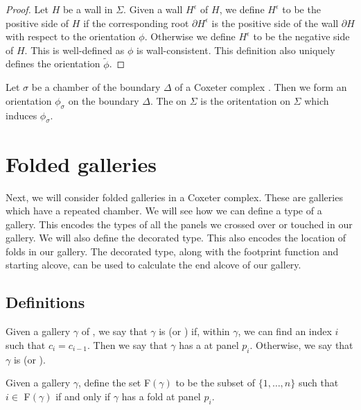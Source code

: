 \documentclass[11pt]{article}
\begin{document}
\begin{proof}
    Let $H$ be a wall in $\Sigma$. Given a wall $H^\epsilon$ of $H$, we define $H^\epsilon$ to be the positive side of $H$ if the corresponding root $\partial H^\epsilon$ is the positive side of the wall $\partial H$ with respect to the orientation $\phi$. Otherwise we define $H^\epsilon$ to be the negative side of $H$. This is well-defined as $\phi$ is wall-consistent. This definition also uniquely defines the orientation $\tilde{\phi}$. 
\end{proof}

\begin{definition}
    Let $\sigma$ be a chamber of the boundary $\Delta$ of a Coxeter complex \sg. Then we form an orientation $\phi_{\sigma}$ on the boundary $\Delta$. The  on $\Sigma$ is the oritentation on $\Sigma$ which induces $\phi_{\sigma}$. 
\end{definition}


\section{Folded galleries}

Next, we will consider folded galleries in a Coxeter complex. These are galleries which have a repeated chamber. We will see how we can define a type of a gallery. This encodes the types of all the panels we crossed over or touched in our gallery. We will also define the decorated type. This also encodes the location of folds in our gallery. The decorated type, along with the footprint function and starting alcove, can be used to calculate the end alcove of our gallery. 

\subsection{Definitions}


\begin{definition}
    Given a gallery $\gamma$ of \sg, we say that $\gamma$ is  (or ) if, within $\gamma$, we can find an index $i$ such that $c_i=c_{i-1}$. Then we say that $\gamma$ has a  at panel $p_i$. Otherwise, we say that $\gamma$ is  (or ).  
\end{definition}

\begin{definition}
    Given a gallery $\gamma$, define the set F$(\gamma)$ to be the subset of $\{1,\hdots ,n\}$ such that $i\in$ F$(\gamma)$ if and only if $\gamma$ has a fold at panel $p_i$. 
\end{definition}
\end{document}

